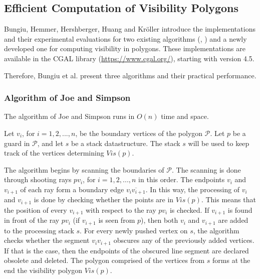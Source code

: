\subsection{Efficient Computation of Visibility Polygons \cite{DBLP:journals/corr/BungiuHHHK14}}
Bungiu, Hemmer, Hershberger, Huang and Kr\"oller  \cite{DBLP:journals/corr/BungiuHHHK14} introduce the implementations and their experimental evaluations for two existing algorithms (\cite{joe1987corrections}, \cite{asano1985efficient}) and a newly developed one for computing visibility in polygons. These implementations are available in the CGAL library (\url{https://www.cgal.org/}), starting with version 4.5.


Therefore, Bungiu et al. present three algorithms and their practical performance.

\subsubsection{Algorithm of Joe and Simpson \cite{joe1987corrections}}
The algorithm of Joe and Simpson \cite{joe1987corrections} runs in $O(n)$ time and space. 

Let $v_i$, for $i = {1, 2, ..., n}$, be the boundary vertices of the polygon $\mathcal P$. Let $p$ be a guard in $\mathcal P$, and let $s$ be a stack datastructure. The stack $s$ will be used to keep track of the vertices determining $Vis(p)$. 

The algorithm begins by scanning the boundaries of $\mathcal P$. The scanning is done through shooting rays $pv_i$, for $i = {1, 2, ..., n}$ in this order. The endpoints $v_i$ and $v_{i + 1}$ of each ray form a boundary edge $\overline{v_iv_{i + 1}}$. In this way, the processing of $v_i$ and $v_{i + 1}$ is done by checking whether the points are in $Vis(p)$. This means that the position of every $v_{i + 1}$ with respect to the ray $pv_i$ is checked. If $v_{i + 1}$ is found in front of the ray $pv_i$ (if $v_{i + 1}$ is seen from $p$), then both $v_i$ and $v_{i + 1}$ are added to the processing stack $s$. For every newly pushed vertex on $s$, the algorithm checks whether the segment $v_iv_{i + 1}$ obscures any of the previously added vertices. If that is the case, then the endpoints of the obscured line segment are declared obsolete and deleted. The polygon comprised of the vertices from $s$ forms at the end the visibility polygon $Vis(p)$.

